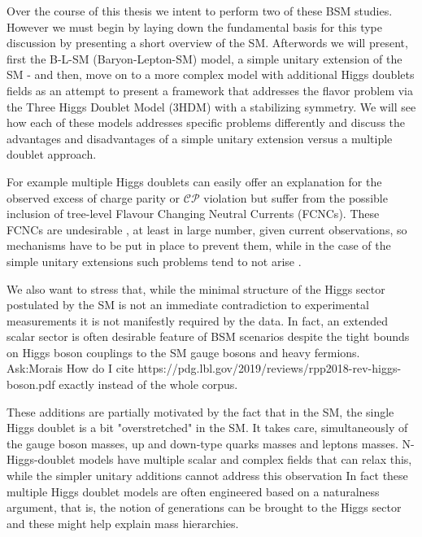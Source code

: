 

Over the course of this thesis we intent to perform two of these BSM studies. However we must begin by laying down the fundamental basis for this type discussion by presenting a short overview of the SM. 
%
%
Afterwords we will present, first the B-L-SM (Baryon-Lepton-SM) model, a simple unitary extension of the SM - and then, move on to a more complex model with additional Higgs doublets fields as an attempt to present a framework that addresses the flavor problem via the Three Higgs Doublet Model (3HDM) with a stabilizing symmetry.
%
We will see how each of these models addresses specific problems differently and discuss the advantages and disadvantages of a simple unitary extension versus a multiple doublet approach. 

For example multiple Higgs doublets can easily offer an explanation for the observed excess of charge parity or $\mathcal{CP}$ violation but suffer from the possible inclusion of tree-level Flavour Changing Neutral Currents (FCNCs). 
%
These FCNCs are undesirable \cite{ILYUSHIN2020114921}, at least in large number, given current observations, so mechanisms have to be put in place to prevent them, while in the case of the simple unitary extensions such problems tend to not arise \cite{Huitu2019}. 

We also want to stress that, while the minimal structure of the Higgs sector postulated by the SM is not an immediate contradiction to experimental measurements it is not manifestly required by the data. 
%
In fact, an extended scalar sector is often desirable feature of BSM scenarios despite the tight bounds on Higgs boson couplings to the SM gauge bosons and heavy fermions. 
{\color{red} Ask:Morais How do I cite https://pdg.lbl.gov/2019/reviews/rpp2018-rev-higgs-boson.pdf exactly instead of the whole corpus}.   

These additions are partially motivated by the fact that in the SM, the single Higgs doublet is a bit "overstretched" in the SM.
%
It  takes  care,  simultaneously of the gauge boson masses, up and down-type quarks masses and leptons masses. 
%
N-Higgs-doublet models have multiple scalar and complex fields that can relax this, while the simpler unitary additions cannot address this observation %
%
In fact these multiple Higgs doublet models are often engineered based on a naturalness argument, that is,  the  notion  of  generations  can  be  brought  to  the  Higgs  sector and these might help explain mass hierarchies. %

